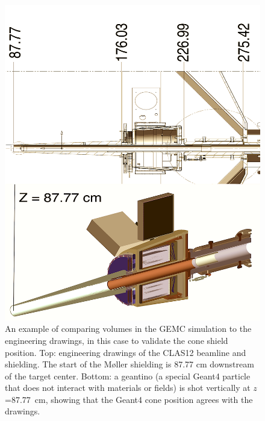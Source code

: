 

\begin{figure}
	\centering
	\includegraphics[width=0.99\columnwidth,keepaspectratio]{img/cadValidationExample.png}
	\caption{An example of comparing volumes in the GEMC simulation to the engineering drawings, in this case to validate the cone shield
             position. Top: engineering drawings of the CLAS12 beamline and shielding. The start of the M\o ller shielding is 87.77 cm downstream
             of the target center. Bottom: a geantino (a special Geant4 particle that does not interact with materials or fields)
             is shot vertically at $z$=87.77~cm, showing that the Geant4 cone position agrees with the drawings.}
	\label{fig:cadValidationExample}
\end{figure}



